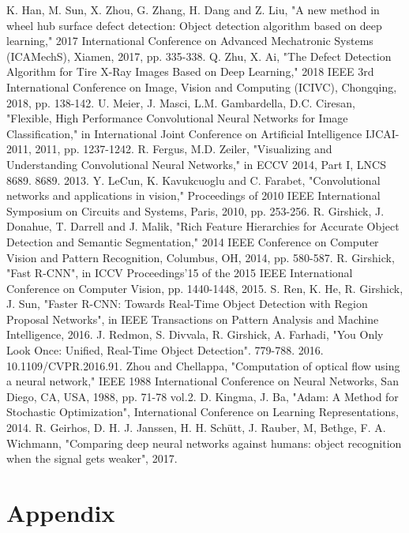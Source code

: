 \documentclass[12pt,a4paper,twoside]{report}
\begin{document}
\begin{thebibliography}{1}
K. Han, M. Sun, X. Zhou, G. Zhang, H. Dang and Z. Liu, "A new method in wheel hub surface defect detection: Object detection algorithm based on deep learning," 2017 International Conference on Advanced Mechatronic Systems (ICAMechS), Xiamen, 2017, pp. 335-338.
Q. Zhu, X. Ai, "The Defect Detection Algorithm for Tire X-Ray Images Based on Deep Learning," 2018 IEEE 3rd International Conference on Image, Vision and Computing (ICIVC), Chongqing, 2018, pp. 138-142.
U. Meier, J. Masci, L.M. Gambardella, D.C. Ciresan, "Flexible, High Performance Convolutional Neural Networks for Image Classification," in International Joint Conference on Artificial Intelligence IJCAI-2011, 2011, pp. 1237-1242.
R. Fergus, M.D. Zeiler, "Visualizing and Understanding Convolutional Neural Networks," in ECCV 2014, Part I, LNCS 8689. 8689. 2013.
Y. LeCun, K. Kavukcuoglu and C. Farabet, "Convolutional networks and applications in vision," Proceedings of 2010 IEEE International Symposium on Circuits and Systems, Paris, 2010, pp. 253-256.
R. Girshick, J. Donahue, T. Darrell and J. Malik, "Rich Feature Hierarchies for Accurate Object Detection and Semantic Segmentation," 2014 IEEE Conference on Computer Vision and Pattern Recognition, Columbus, OH, 2014, pp. 580-587.
R. Girshick, "Fast R-CNN", in ICCV Proceedings'15 of the 2015 IEEE International Conference on Computer Vision, pp. 1440-1448, 2015. 
S. Ren, K. He, R. Girshick, J. Sun, "Faster R-CNN: Towards Real-Time Object
Detection with Region Proposal Networks", in IEEE Transactions on Pattern Analysis and Machine Intelligence, 2016.
J. Redmon, S. Divvala, R. Girshick, A. Farhadi, "You Only Look Once: Unified, Real-Time Object Detection". 779-788. 2016. 10.1109/CVPR.2016.91.
Zhou and Chellappa, "Computation of optical flow using a neural network," IEEE 1988 International Conference on Neural Networks, San Diego, CA, USA, 1988, pp. 71-78 vol.2.
D. Kingma, J. Ba, "Adam: A Method for Stochastic Optimization", International Conference on Learning Representations, 2014.
R. Geirhos, D. H. J. Janssen, H. H. Schütt, J. Rauber, M, Bethge, F. A. Wichmann, "Comparing deep neural networks against humans:
object recognition when the signal gets weaker", 2017.

\end{thebibliography}

\chapter{Appendix}
\end{document}
